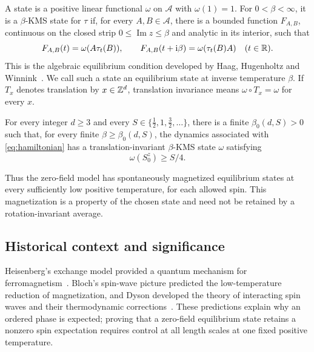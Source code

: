 A state is a positive linear functional $\omega$ on $\mathcal A$ with
$\omega(1)=1$.  For $0<\beta<\infty$, it is a $\beta$-KMS state for $\tau$
if, for every $A,B\in\mathcal A$, there is a bounded function
$F_{A,B}$, continuous on the closed strip $0\leq\operatorname{Im}z\leq\beta$
and analytic in its interior, such that
\begin{equation}\label{eq:kms-definition}
 F_{A,B}(t)=\omega(A\tau_t(B)),\qquad
 F_{A,B}(t+\mathrm i\beta)=\omega(\tau_t(B)A)
 \quad(t\in\mathbb R).
\end{equation}
This is the algebraic equilibrium condition developed by Haag,
Hugenholtz and Winnink~\cite{HaagHugenholtzWinnink1967}.
We call such a state an equilibrium state at inverse temperature $\beta$.
If $T_x$ denotes translation by $x\in\mathbb Z^d$, translation invariance means
$\omega\circ T_x=\omega$ for every $x$.

\begin{theorem}\label{thm:main}
For every integer $d\geq3$ and every
$S\in\{\frac12,1,\frac32,\ldots\}$, there is a finite
$\beta_0(d,S)>0$ such that, for every finite $\beta\geq\beta_0(d,S)$,
the dynamics associated with \eqref{eq:hamiltonian} has a
translation-invariant $\beta$-KMS state $\omega$ satisfying
\[
                         \omega(S_0^z)\ge S/4.
\]
\end{theorem}

Thus the zero-field model has spontaneously magnetized equilibrium states
at every sufficiently low positive temperature, for each allowed spin.
This magnetization is a property of the chosen state and need not be
retained by a rotation-invariant average.

\subsection{Historical context and significance}

Heisenberg's exchange model provided a quantum mechanism for
ferromagnetism~\cite{Heisenberg1928}.  Bloch's spin-wave picture predicted
the low-temperature reduction of magnetization, and Dyson developed the
theory of interacting spin waves and their thermodynamic
corrections~\cite{Bloch1930,Dyson1956Interactions,Dyson1956Thermodynamics}.
These predictions explain why an ordered phase is expected; proving
that a zero-field equilibrium state retains a nonzero spin expectation
requires control at all length scales at one fixed positive temperature.

